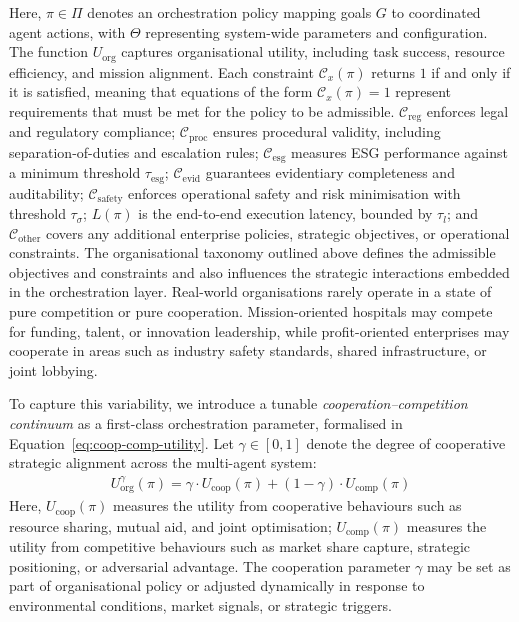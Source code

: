 \documentclass[oneside,10pt]{swissi}
\begin{document}
Here, $\pi \in \Pi$ denotes an orchestration policy mapping goals $G$ to coordinated agent actions, with $\Theta$ representing system-wide parameters and configuration. The function $U_{\text{org}}$ captures organisational utility, including task success, resource efficiency, and mission alignment. Each constraint $\mathcal{C}_x(\pi)$ returns $1$ if and only if it is satisfied, meaning that equations of the form $\mathcal{C}_x(\pi) = 1$ represent requirements that must be met for the policy to be admissible. $\mathcal{C}_{\text{reg}}$ enforces legal and regulatory compliance; $\mathcal{C}_{\text{proc}}$ ensures procedural validity, including separation-of-duties and escalation rules; $\mathcal{C}_{\text{esg}}$ measures ESG performance against a minimum threshold $\tau_{\text{esg}}$; $\mathcal{C}_{\text{evid}}$ guarantees evidentiary completeness and auditability; $\mathcal{C}_{\text{safety}}$ enforces operational safety and risk minimisation with threshold $\tau_{\sigma}$; $L(\pi)$ is the end-to-end execution latency, bounded by $\tau_l$; and $\mathcal{C}_{\text{other}}$ covers any additional enterprise policies, strategic objectives, or operational constraints. The organisational taxonomy outlined above defines the admissible objectives and constraints and also influences the strategic interactions embedded in the orchestration layer. Real-world organisations rarely operate in a state of pure competition or pure cooperation. Mission-oriented hospitals may compete for funding, talent, or innovation leadership, while profit-oriented enterprises may cooperate in areas such as industry safety standards, shared infrastructure, or joint lobbying.

To capture this variability, we introduce a tunable \emph{cooperation–competition continuum} as a first-class orchestration parameter, formalised in Equation~\eqref{eq:coop-comp-utility}. Let $\gamma \in [0,1]$ denote the degree of cooperative strategic alignment across the multi-agent system:
\begin{align}
U_{\text{org}}^{\gamma}(\pi) = \gamma \cdot U_{\text{coop}}(\pi) + (1 - \gamma) \cdot U_{\text{comp}}(\pi) \label{eq:coop-comp-utility}
\end{align}
Here, $U_{\text{coop}}(\pi)$ measures the utility from cooperative behaviours such as resource sharing, mutual aid, and joint optimisation; $U_{\text{comp}}(\pi)$ measures the utility from competitive behaviours such as market share capture, strategic positioning, or adversarial advantage. The cooperation parameter $\gamma$ may be set as part of organisational policy or adjusted dynamically in response to environmental conditions, market signals, or strategic triggers.
\end{document}
